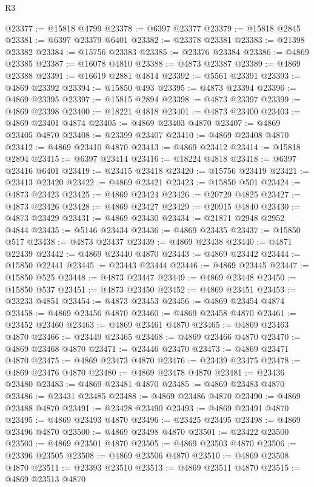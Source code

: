 \begin{lexlean}{R3}
\begin{coremodule}
@23377 := @15818 @4799
@23378 := @6397 @23377
@23379 := @15818 @2845
@23381 := @6397 @23379 @6401
@23382 := @23378 @23381
@23383 := @21398 @23382
@23384 := @15756 @23383
@23385 := @23376 @23384
@23386 := @4869 @23385
@23387 := @16078 @4810
@23388 := @4873 @23387
@23389 := @4869 @23388
@23391 := @16619 @2881 @4814
@23392 := @5561 @23391
@23393 := @4869 @23392
@23394 := @15850 @493
@23395 := @4873 @23394
@23396 := @4869 @23395
@23397 := @15815 @2894
@23398 := @4873 @23397
@23399 := @4869 @23398
@23400 := @18221 @4818
@23401 := @4873 @23400
@23403 := @4869 @23401 @4874
@23405 := @4869 @23403 @4870
@23407 := @4869 @23405 @4870
@23408 := @23399 @23407
@23410 := @4869 @23408 @4870
@23412 := @4869 @23410 @4870
@23413 := @4869 @23412
@23414 := @15818 @2894
@23415 := @6397 @23414
@23416 := @18224 @4818
@23418 := @6397 @23416 @6401
@23419 := @23415 @23418
@23420 := @15756 @23419
@23421 := @23413 @23420
@23422 := @4869 @23421
@23423 := @15850 @501
@23424 := @4873 @23423
@23425 := @4869 @23424
@23426 := @20729 @4825
@23427 := @4873 @23426
@23428 := @4869 @23427
@23429 := @20915 @4840
@23430 := @4873 @23429
@23431 := @4869 @23430
@23434 := @21871 @2948 @2952 @4844
@23435 := @5146 @23434
@23436 := @4869 @23435
@23437 := @15850 @517
@23438 := @4873 @23437
@23439 := @4869 @23438
@23440 := @4871 @22439
@23442 := @4869 @23440 @4870
@23443 := @4869 @23442
@23444 := @15850 @22441
@23445 := @23443 @23444
@23446 := @4869 @23445
@23447 := @15850 @525
@23448 := @4873 @23447
@23449 := @4869 @23448
@23450 := @15850 @537
@23451 := @4873 @23450
@23452 := @4869 @23451
@23453 := @23233 @4851
@23454 := @4873 @23453
@23456 := @4869 @23454 @4874
@23458 := @4869 @23456 @4870
@23460 := @4869 @23458 @4870
@23461 := @23452 @23460
@23463 := @4869 @23461 @4870
@23465 := @4869 @23463 @4870
@23466 := @23449 @23465
@23468 := @4869 @23466 @4870
@23470 := @4869 @23468 @4870
@23471 := @23446 @23470
@23473 := @4869 @23471 @4870
@23475 := @4869 @23473 @4870
@23476 := @23439 @23475
@23478 := @4869 @23476 @4870
@23480 := @4869 @23478 @4870
@23481 := @23436 @23480
@23483 := @4869 @23481 @4870
@23485 := @4869 @23483 @4870
@23486 := @23431 @23485
@23488 := @4869 @23486 @4870
@23490 := @4869 @23488 @4870
@23491 := @23428 @23490
@23493 := @4869 @23491 @4870
@23495 := @4869 @23493 @4870
@23496 := @23425 @23495
@23498 := @4869 @23496 @4870
@23500 := @4869 @23498 @4870
@23501 := @23422 @23500
@23503 := @4869 @23501 @4870
@23505 := @4869 @23503 @4870
@23506 := @23396 @23505
@23508 := @4869 @23506 @4870
@23510 := @4869 @23508 @4870
@23511 := @23393 @23510
@23513 := @4869 @23511 @4870
@23515 := @4869 @23513 @4870

\end{coremodule}
\end{lexlean}

